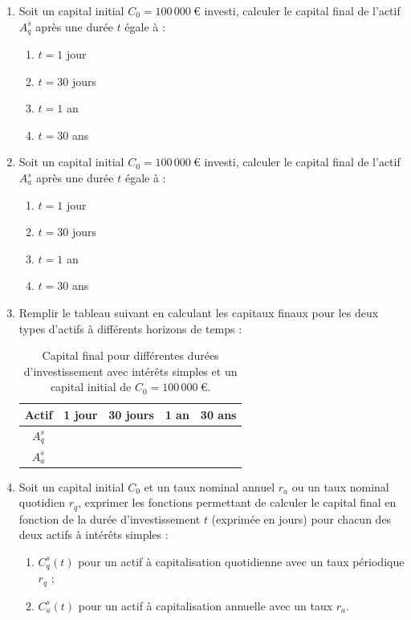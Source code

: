 \documentclass{article}
\begin{document}
\begin{enumerate}[label=\textbf{Q\arabic*.}]
    \item Soit un capital initial \( C_0 = 100\,000\ \text{€} \) investi, calculer le capital final de l'actif \( A_q^s \) après une durée \( t \) égale à :
    \begin{enumerate}[label=(\alph*)]
        \item \( t = 1 \) jour
        \item \( t = 30 \) jours
        \item \( t = 1 \) an
        \item \( t = 30 \) ans
    \end{enumerate}

    \item Soit un capital initial \( C_0 = 100\,000\ \text{€} \) investi, calculer le capital final de l'actif \( A_a^s \) après une durée \( t \) égale à :
    \begin{enumerate}[label=(\alph*)]
        \item \( t = 1 \) jour
        \item \( t = 30 \) jours
        \item \( t = 1 \) an
        \item \( t = 30 \) ans
    \end{enumerate}
    
    \item Remplir le tableau suivant en calculant les capitaux finaux pour les deux types d'actifs à différents horizons de temps :\\
    \begin{table}[h!]
        \centering
        \begin{tabular}{|c|c|c|c|c|}
        \hline
        \textbf{Actif} & \textbf{1 jour} & \textbf{30 jours} & \textbf{1 an} & \textbf{30 ans} \\
        \hline
        \( A_q^s \) & & & & \\
        \hline
        \( A_a^s \) & & & & \\
        \hline
        \end{tabular}
        \caption{Capital final pour différentes durées d'investissement avec intérêts simples et un capital initial de \( C_0 = 100\,000\ \text{€} \).}
        \label{tab:simple_interest_results}
    \end{table}

    \item Soit un capital initial \( C_0 \) et un taux nominal annuel \( r_a \) ou un taux nominal quotidien \( r_q \), exprimer les fonctions permettant de calculer le capital final en fonction de la durée d'investissement \( t \) (exprimée en jours) pour chacun des deux actifs à intérêts simples :
    \begin{enumerate}[label=(\alph*)]
        \item \( C^s_q(t) \) pour un actif à capitalisation quotidienne avec un taux périodique \( r_q \) ;
        \item \( C^s_a(t) \) pour un actif à capitalisation annuelle avec un taux \( r_a \).
    \end{enumerate}


\end{enumerate}
\end{document}
